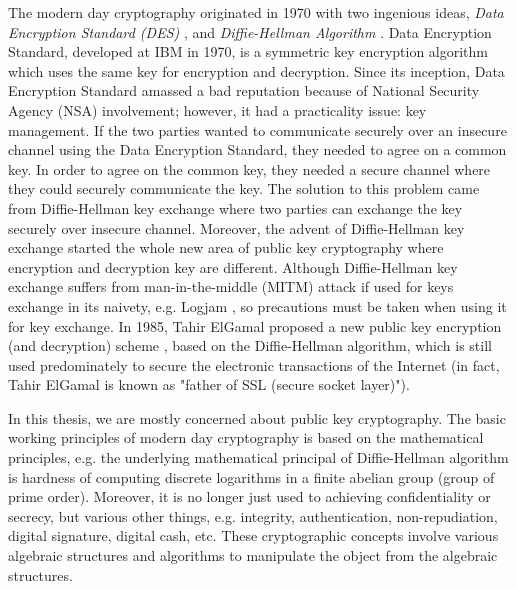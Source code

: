 	The modern day cryptography originated in 1970 with two ingenious ideas, \textit{Data Encryption Standard (DES)} \citep{standard1999data}, 
	and \textit{Diffie-Hellman Algorithm} \citep{Diffie:2006:NDC:2263321.2269104}.  Data Encryption Standard, developed at IBM in 1970, is a symmetric 
	key encryption algorithm which uses the same key for encryption and decryption. Since its inception, Data Encryption Standard
	amassed a bad reputation because of National Security Agency (NSA) involvement; however, it had a 
	practicality issue: key management. If the two parties wanted to communicate
	securely over an insecure channel using  the Data Encryption Standard,  they needed to agree on a common key. 
	In order to agree on the common key, they needed a secure channel where they could securely communicate the key. 
    The solution to this problem came from Diffie-Hellman key exchange where two parties can exchange the 
    key securely over insecure channel. Moreover, the advent of Diffie-Hellman key exchange started the 
    whole new area of public key cryptography where encryption and decryption key are different. 
    Although Diffie-Hellman key exchange suffers from  man-in-the-middle (MITM)  attack if used for keys exchange in its 
    naivety, e.g. Logjam \citep{Adrian:2015:IFS:2810103.2813707},  so precautions must be taken when using it for key exchange. 
    In 1985, Tahir ElGamal  proposed  a new public key encryption (and decryption) scheme \citep{elgamal1985public},  based on the Diffie-Hellman algorithm, 
    which is still used predominately to secure the electronic transactions of the Internet (in fact, Tahir ElGamal is known as "father of SSL (secure socket layer)"). 
   
    
    
    
    In this thesis, we are mostly concerned about public key cryptography.
    The basic working principles of modern day cryptography is based on the
    mathematical principles,  e.g.  the underlying  mathematical principal of Diffie-Hellman  algorithm 
    is hardness of computing discrete logarithms in a finite abelian group (group of prime order).  Moreover,  it is no longer just 
    used to achieving confidentiality or secrecy, but various other things, e.g. integrity,  authentication, non-repudiation, 
    digital signature, digital cash, etc. These cryptographic concepts involve 
    various algebraic structures and algorithms to manipulate the object from the algebraic structures.
    
    
    
